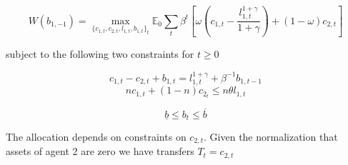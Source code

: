 \documentclass[thmsb,11pt]{article}
\begin{document}
\label{sec two agents} 

\begin{equation}
W(b_{1,-1})=\max_{\{c_{1,t},c_{2,t},l_{1,t},b_{1,t}\}_t} \mathbb{E}_0\sum_{t}\beta^{t}\left[\omega \left(c_{1,t}-\frac{l_{1,t}^{1+\gamma}}{1+\gamma}\right)+(1-\omega)c_{2,t}\right]
\end{equation}

subject to the following two constraints for $t\geq 0$

\begin{equation}
\label{imp}
c_{1,t}-c_{2,t}+b_{1,t}=l_{1,t}^{1+\gamma}+\beta^{-1}b_{1,t-1}
\end{equation}
\begin{equation}
nc_{1,t}+(1-n)c_{2_t}\leq n \theta  l_{1,t}
\end{equation}

\begin{equation}
\underline{b}\leq b_t\leq \overline{b}
\end{equation}

The allocation depends on constraints on $c_{2,t}$. Given the normalization that assets of agent 2 are zero we have transfers $T_t=c_{2,t}$
\end{document}
